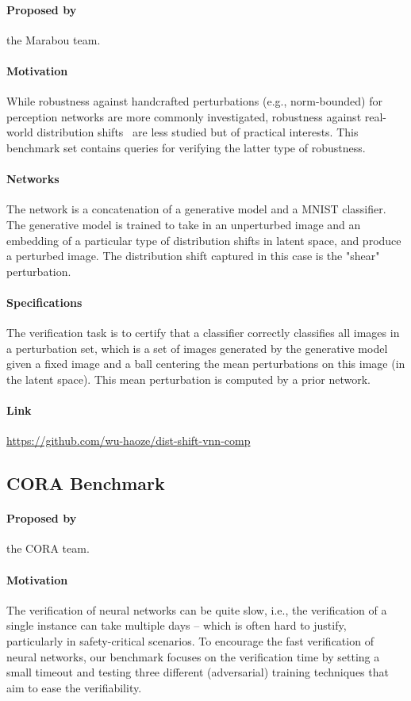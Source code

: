 \documentclass[oneside,11pt,dvipsnames]{book}
\begin{document}
\paragraph*{Proposed by} the Marabou team.
\paragraph*{Motivation}
While robustness against handcrafted perturbations (e.g., norm-bounded) for perception networks are more commonly investigated, robustness against real-world distribution shifts~\cite{wu2022toward} are less studied but of practical interests. This benchmark set contains queries for verifying the latter type of robustness.  
\paragraph*{Networks} The network is a concatenation of a generative model and a MNIST classifier. The generative model is trained to take in an unperturbed image and an embedding of a particular type of distribution shifts in latent space, and produce a perturbed image. The distribution shift captured in this case is the "shear" perturbation. 
\paragraph*{Specifications} The verification task is to certify that a classifier correctly classifies all images in a perturbation set, which is a set of images generated by the generative model given a fixed image and a ball centering the mean perturbations on this image (in the latent space). This mean perturbation is computed by a prior network.
\paragraph*{Link} \url{https://github.com/wu-haoze/dist-shift-vnn-comp}


\subsection{CORA Benchmark}
\paragraph*{Proposed by} the CORA team.
\paragraph*{Motivation}
The verification of neural networks can be quite slow, i.e., the verification of a single instance can take multiple days -- which is often hard to justify, particularly in safety-critical scenarios. To encourage the fast verification of neural networks, our benchmark focuses on the verification time by setting a small timeout and testing three different (adversarial) training techniques that aim to ease the verifiability.
\end{document}
